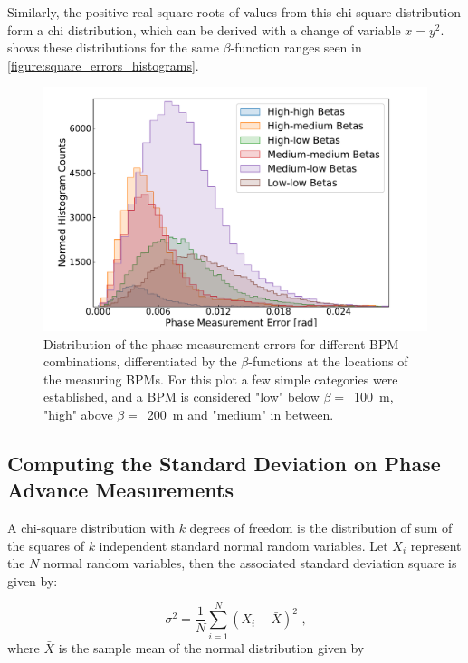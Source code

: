 Similarly, the positive real square roots of values from this chi-square distribution form a chi distribution, which can be derived with a change of variable \(x=y^2\).
 shows these distributions for the same \(\beta\)-function ranges seen in \cref{figure:square_errors_histograms}.

\begin{figure}[!htb]
    \centering
    \includegraphics*[width=\textwidth]{Figures/Other_Studies/phase_errors_distributions.pdf}
    \caption{Distribution of the phase measurement errors for different BPM combinations, differentiated by the \(\beta\)-functions at the locations of the measuring BPMs. For this plot a few simple categories were established, and a BPM is considered "low" below \(\beta =\)~\qty{100}{\meter}, "high" above \(\beta =\)~\qty{200}{\meter} and "medium" in between.}
    \label{figure:phase_errors_histograms}
\end{figure}

\subsection{Computing the Standard Deviation on Phase Advance Measurements}

A chi-square distribution with \(k\) degrees of freedom  is the distribution of sum of the squares of \(k\) independent standard normal random variables.
Let \(X_{i}\) represent the \(N\) normal random variables, then the associated standard deviation square is given by:

\begin{equation}
    \sigma^{2} = \frac{1}{N} \sum_{i=1}^{N} \left( X_{i} - \bar{X} \right)^{2} \text{ ,}
    \label{equation:chi2_dist_build_from_normals}
\end{equation}
where \(\bar{X}\) is the sample mean of the normal distribution given by

